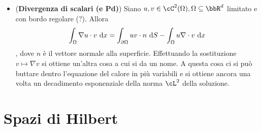 \documentclass[a4paper,NoNotes,GeneralMath]{stdmdoc}
\begin{document}
\begin{itemize}
        \item ({\bf Divergenza di scalari (e Pd)}) Siano $u, v \in \cC^2(\Omega), \Omega \subseteq \bbR^d$ limitato e con bordo regolare (?). Allora $$ \int_\Omega \nabla u \cdot v \de x = \int_{\dpar \Omega} uv \cdot n \de S - \int_{\Omega} u \nabla \cdot v \de x $$, dove $n$ è il vettore normale alla superficie. Effettuando la sostituzione $v \mapsto \nabla v$ si ottiene un'altra cosa a cui si da un nome. A questa cosa ci si può buttare dentro l'equazione del calore in più variabili e si ottiene ancora una volta un decadimento esponenziale della norma $\cL^2$ della soluzione.
        \end{itemize}
        
        \section*{Spazi di Hilbert}
\end{document}
